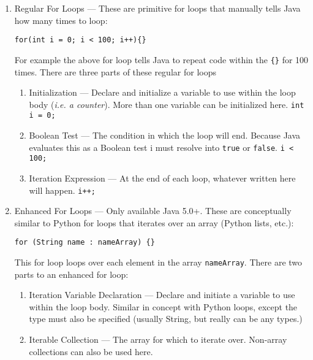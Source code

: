 \documentclass{tufte-handout}
\begin{document}
    \begin{enumerate}
        \item Regular For Loops --- These are primitive for loops that manually tells Java how many times to loop:
        \begin{lstlisting}
for(int i = 0; i < 100; i++){}             
        \end{lstlisting}
        For example the above for loop tells Java to repeat code within the \texttt{\{\}} for 100 times. There are three parts of these regular for loops
        \begin{enumerate}
            \item Initialization --- Declare and initialize a variable to use within the loop body (\textit{i.e. a counter}). More than one variable can be initialized here. \texttt{int i = 0;} 
            \item Boolean Test --- The condition in which the loop will end. Because Java evaluates this as a Boolean test i must resolve into \texttt{true} or \texttt{false}. \texttt{i < 100;}
            \item Iteration Expression --- At the end of each loop, whatever written here will happen. \texttt{i++;}
        \end{enumerate}
        \item Enhanced For Loops --- Only available Java 5.0+. These are conceptually similar to Python for loops that iterates over an array (Python lists, etc.):
        \begin{lstlisting}
for (String name : nameArray) {}                     
        \end{lstlisting}
        This for loop loops over each element in the array \texttt{nameArray}. There are two parts to an enhanced for loop:
        \begin{enumerate}
            \item Iteration Variable Declaration --- Declare and initiate a variable to use within the loop body. Similar in concept with Python loops, except the type must also be specified (usually String, but really can be any types.) 
            \item Iterable Collection --- The array for which to iterate over. Non-array collections can also be used here. 
        \end{enumerate}         
    \end{enumerate}
\end{document}
